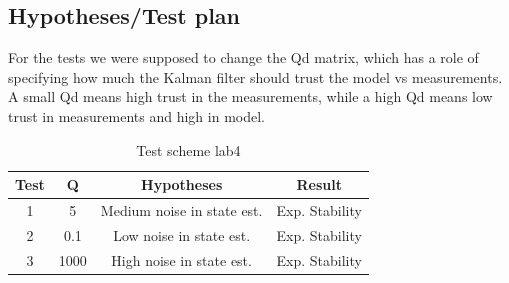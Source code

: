 \subsection{Hypotheses/Test plan}
For the tests we were supposed to change the Qd matrix, which has a role of specifying how much the Kalman filter should trust the model vs measurements. A small Qd 
means high trust in the measurements, while a high Qd means low trust in measurements and high in model. 
\begin{table}[h]
    \centering
        \begin{tabular}{||c c c c||} 
         \hline
         Test & Q  & Hypotheses & Result \\ [0.5ex] 
         \hline\hline
         1 & 5 & Medium noise in state est. & Exp. Stability \\ 
         \hline
         2 & 0.1 & Low noise in state est. & Exp. Stability \\
         \hline
         3 & 1000 & High noise in state est. & Exp. Stability  \\ [1ex]
         \hline
        \end{tabular}
        \label{tab:testskjema_lab4}
        \caption{Test scheme lab4}
    \end{table}

